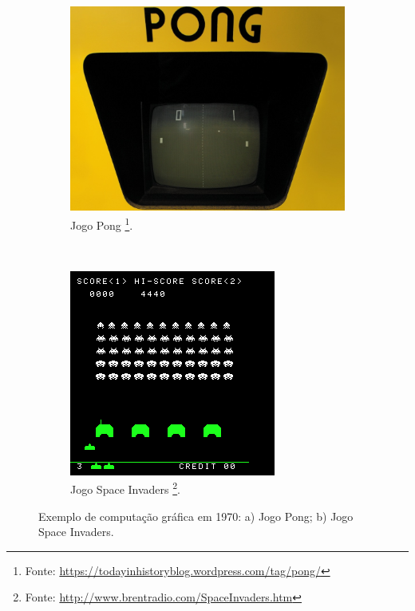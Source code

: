 \begin{savenotes}
 \begin{figure}[!htp]
    \centering
    \begin{subfigure}[t]{0.4\textwidth}
        \centerline{\includegraphics[width=.9\textwidth]{img/pong1}}
        \caption{Jogo Pong \footnote{Fonte: \url{https://todayinhistoryblog.wordpress.com/tag/pong/}}.}
    \end{subfigure}
    ~
    \begin{subfigure}[t]{0.4\textwidth}
        \centerline{\includegraphics[width=.9\textwidth]{img/si}}
        \caption{Jogo Space Invaders \footnote{Fonte: \url{http://www.brentradio.com/SpaceInvaders.htm}}.}
    \end{subfigure}
    \caption{Exemplo de computação gráfica em 1970: a) Jogo Pong; b) Jogo Space Invaders.}

\end{figure}
\end{savenotes}


